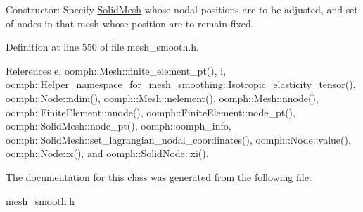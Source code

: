Constructor\+: Specify \hyperlink{classoomph_1_1SolidMesh}{Solid\+Mesh} whose nodal positions are to be adjusted, and set of nodes in that mesh whose position are to remain fixed. 



Definition at line 550 of file mesh\+\_\+smooth.\+h.



References e, oomph\+::\+Mesh\+::finite\+\_\+element\+\_\+pt(), i, oomph\+::\+Helper\+\_\+namespace\+\_\+for\+\_\+mesh\+\_\+smoothing\+::\+Isotropic\+\_\+elasticity\+\_\+tensor(), oomph\+::\+Node\+::ndim(), oomph\+::\+Mesh\+::nelement(), oomph\+::\+Mesh\+::nnode(), oomph\+::\+Finite\+Element\+::nnode(), oomph\+::\+Finite\+Element\+::node\+\_\+pt(), oomph\+::\+Solid\+Mesh\+::node\+\_\+pt(), oomph\+::oomph\+\_\+info, oomph\+::\+Solid\+Mesh\+::set\+\_\+lagrangian\+\_\+nodal\+\_\+coordinates(), oomph\+::\+Node\+::value(), oomph\+::\+Node\+::x(), and oomph\+::\+Solid\+Node\+::xi().



The documentation for this class was generated from the following file\+:\begin{DoxyCompactItemize}
\item 
\hyperlink{mesh__smooth_8h}{mesh\+\_\+smooth.\+h}\end{DoxyCompactItemize}
